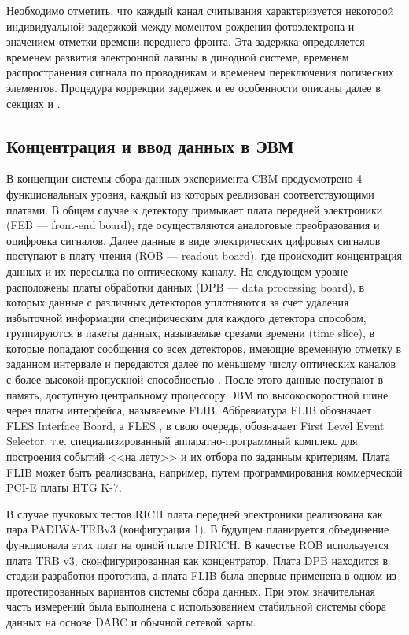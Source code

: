 Необходимо отметить, что каждый канал считывания характеризуется некоторой индивидуальной задержкой между моментом рождения фотоэлектрона и значением отметки времени переднего фронта. Эта задержка определяется временем развития электронной лавины в динодной системе, временем распространения сигнала по проводникам и временем переключения логических элементов. Процедура коррекции задержек и ее особенности описаны далее в секциях \cite{} и \cite{}.

\subsection{Концентрация и ввод данных в ЭВМ}


В концепции системы сбора данных эксперимента CBM предусмотрено 4 функциональных уровня, каждый из которых реализован соответствующими платами. В общем случае к детектору примыкает плата передней электроники (FEB --- front-end board), где осуществляются аналоговые преобразования и оцифровка сигналов. Далее данные в виде электрических цифровых сигналов поступают в плату чтения (ROB --- readout board), где происходит концентрация данных и их пересылка по оптическому каналу. На следующем уровне расположены платы обработки данных (DPB --- data processing board), в которых данные с различных детекторов уплотняются за счет удаления избыточной информации специфическим для каждого детектора способом, группируются в пакеты данных, называемые срезами времени (time slice), в которые попадают сообщения со всех детекторов, имеющие временную отметку в заданном интервале и передаются далее по меньшему числу оптических каналов с более высокой пропускной способностью \cite{}. После этого данные поступают в память, доступную центральному процессору ЭВМ по высокоскоростной шине через платы интерфейса, называемые FLIB. Аббревиатура FLIB обозначает FLES Interface Board, а FLES \cite{}, в свою очередь, обозначает First Level Event Selector, т.е. специализированный аппаратно-программный комплекс для построения событий <<на лету>> и их отбора по заданным критериям. Плата FLIB может быть реализована, например, путем программирования коммерческой  PCI-E платы HTG K-7.

В случае пучковых тестов RICH плата передней электроники реализована как пара PADIWA-TRBv3 (конфигурация 1). В будущем планируется объединение функционала этих плат на одной плате DIRICH. В качестве ROB используется плата TRB v3, сконфигурированная как концентратор. Плата DPB находится в стадии разработки прототипа, а плата FLIB была впервые применена в одном из протестированных вариантов системы сбора данных. При этом значительная часть измерений была выполнена с использованием стабильной системы сбора данных на основе DABC \cite{} и обычной сетевой карты.
